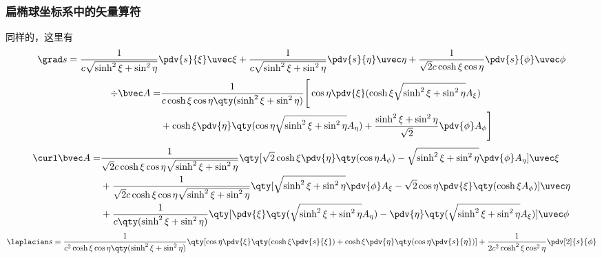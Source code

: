 \subsubsection{扁椭球坐标系中的矢量算符}
同样的，这里有
\begin{equation}
\grad s = \frac{1}{c\sqrt{\sinh^2\xi+\sin^2\eta}} \pdv{s}{\xi}\uvec \xi + \frac{1}{c\sqrt{\sinh^2\xi+\sin^2\eta}}\pdv{s}{\eta} \uvec \eta +  \frac{1}{\sqrt{2}c\cosh\xi\cos\eta}\pdv{s}{\phi}\uvec \phi
\end{equation}
\begin{equation}
\begin{aligned}
\div \bvec A = &\frac{1}{c\cosh\xi\cos\eta\qty(\sinh^2\xi+\sin^2\eta)}\Bigg[\cos\eta\pdv{\xi}(\cosh\xi\sqrt{\sinh^2\xi+\sin^2\eta}A_\xi) \\&+ \cosh\xi\pdv{\eta}\qty(\cos\eta\sqrt{\sinh^2\xi+\sin^2\eta}A_\eta) + \frac{\sinh^2\xi+\sin^2\eta}{\sqrt{2}}\pdv{\phi}A_\phi\Bigg]
\end{aligned}
\end{equation}
\begin{equation}
\begin{aligned}
\curl \bvec A =& \frac{1}{\sqrt{2}c\cosh\xi\cos\eta\sqrt{\sinh^2\xi+\sin^2\eta}}\qty[\sqrt{2}\cosh\xi\pdv{\eta}\qty(\cos\eta
A_\phi) - \sqrt{\sinh^2\xi+\sin^2\eta}\pdv{\phi}A_\eta]\uvec \xi\\
&+ \frac{1}{\sqrt{2}c\cosh\xi\cos\eta\sqrt{\sinh^2\xi+\sin^2\eta}}\qty[\sqrt{\sinh^2\xi+\sin^2\eta}\pdv{\phi}A_\xi - \sqrt{2}\cos\eta\pdv{\xi}\qty(\cosh\xi
A_\phi)]\uvec \eta
 \\
&+\frac{1}{c\qty(\sinh^2\xi+\sin^2\eta)}\qty[\pdv{\xi}\qty(\sqrt{\sinh^2\xi+\sin^2\eta}A_\eta) - \pdv{\eta}\qty(\sqrt{\sinh^2\xi+\sin^2\eta}A_\xi)]\uvec \phi
\end{aligned}
\end{equation}
\begin{equation}
\laplacian s = \frac{1}{c^2\cosh\xi\cos\eta\qty(\sinh^2\xi+\sin^2\eta)}\qty[\cos\eta\pdv{\xi}\qty(\cosh\xi\pdv{s}{\xi}) + \cosh\xi\pdv{\eta}\qty(\cos\eta\pdv{s}{\eta})]+ \frac{1}{2c^2\cosh^2\xi\cos^2\eta }\pdv[2]{s}{\phi}
\end{equation}

